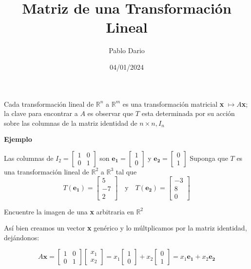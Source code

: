 \documentclass{article}
\title{Matriz de una Transformación Lineal}
\author{Pablo Dario}
\date{04/01/2024}
\begin{document}
\maketitle

Cada transformación lineal de $\mathbb{R}^n$ a $\mathbb{R}^m$ es una transformación matricial \textbf{x} $\longmapsto A$\textbf{x}; la clave para encontrar a $A$ es observar que $T$ esta determinada por su acción sobre las columnas de la matriz identidad de $n \times n, I_n$

\begin{large}
    \textbf{Ejemplo}
\end{large}

Las columnas de $I_2 = \begin{bmatrix} 1 & 0 \\ 0 & 1 \end{bmatrix}$ son $\mathbf{e_1} = \begin{bmatrix} 1 \\ 0 \end{bmatrix}$ y $\mathbf{e_2} = \begin{bmatrix} 0 \\ 1 \end{bmatrix}$ Suponga que $T$ es una transformación lineal de $\mathbb{R}^2$ a $\mathbb{R}^3$ tal que $$T(\mathbf{e_1}) = \left[\begin{array}{r} 5 \\ -7 \\ 2 \end{array}\right] \quad \text{y} \quad T(\mathbf{e_2}) = \left[\begin{array}{r} -3 \\ 8 \\ 0 \end{array}\right]$$

Encuentre la imagen de una \textbf{x} arbitraria en $\mathbb{R}^2$

Así bien creamos un vector \textbf{x} genérico y lo múltplicamos por la matriz identidad, dejándonos: 

\begin{equation*}
    A\mathbf{x} = \begin{bmatrix} 1 & 0 \\ 0 & 1 \end{bmatrix} \begin{bmatrix} x_1 \\ x_2 \end{bmatrix} 
    = x_1 \begin{bmatrix}
        1 \\0 
    \end{bmatrix} + x_2 \begin{bmatrix}
        0 \\ 1
    \end{bmatrix}
    = x_1\mathbf{e_1} + x_2\mathbf{e_2}
\end{equation*}
\end{document}

